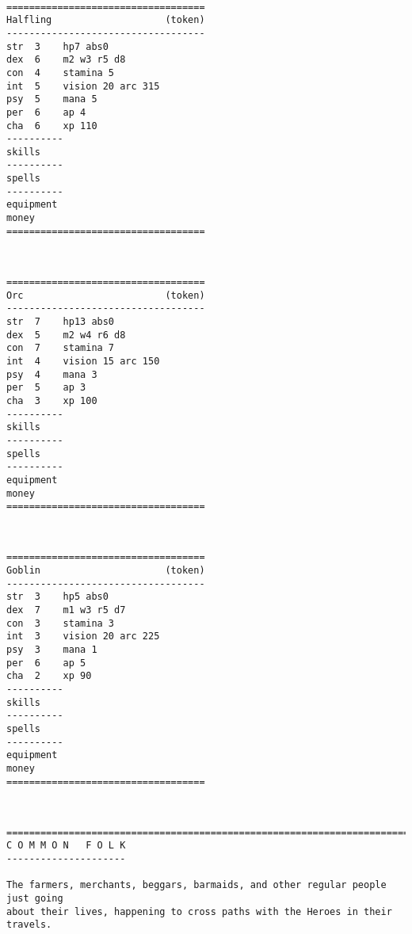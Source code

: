 \

\goodbreak \small \begin{samepage} \begin{verbatim}
===================================
Halfling                    (token)
-----------------------------------
str  3    hp7 abs0
dex  6    m2 w3 r5 d8
con  4    stamina 5
int  5    vision 20 arc 315
psy  5    mana 5
per  6    ap 4
cha  6    xp 110
----------
skills
----------
spells
----------
equipment
money
===================================
\end{verbatim} \end{samepage} \normalsize

\

\goodbreak \small \begin{samepage} \begin{verbatim}
===================================
Orc                         (token)
-----------------------------------
str  7    hp13 abs0
dex  5    m2 w4 r6 d8
con  7    stamina 7
int  4    vision 15 arc 150
psy  4    mana 3
per  5    ap 3
cha  3    xp 100
----------
skills
----------
spells
----------
equipment
money
===================================
\end{verbatim} \end{samepage} \normalsize

\

\goodbreak \small \begin{samepage} \begin{verbatim}
===================================
Goblin                      (token)
-----------------------------------
str  3    hp5 abs0
dex  7    m1 w3 r5 d7
con  3    stamina 3
int  3    vision 20 arc 225
psy  3    mana 1
per  6    ap 5
cha  2    xp 90
----------
skills
----------
spells
----------
equipment
money
===================================
\end{verbatim} \end{samepage} \normalsize

\









\goodbreak
{}


\goodbreak \begin{samepage} \small \begin{verbatim}
================================================================================
C O M M O N   F O L K
---------------------

The farmers, merchants, beggars, barmaids, and other regular people just going
about their lives, happening to cross paths with the Heroes in their travels.
\end{verbatim} \normalsize \end{samepage}

